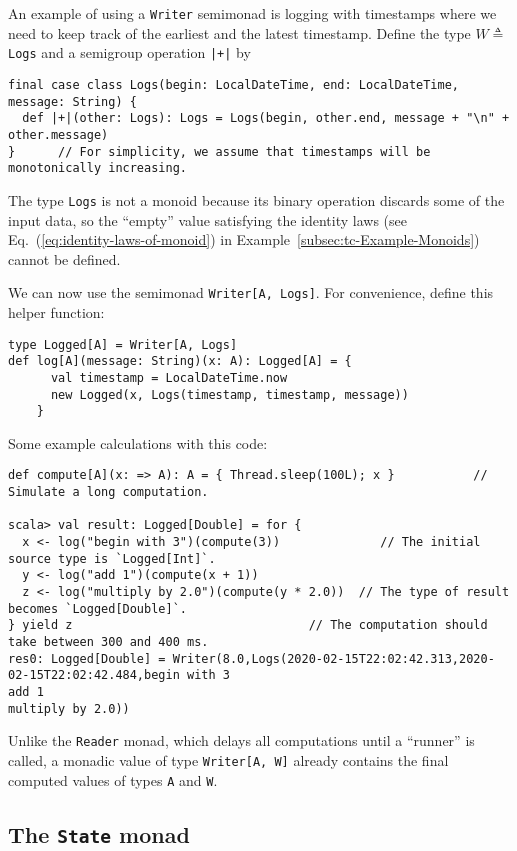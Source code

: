 An example of using a \lstinline!Writer! semimonad
is logging with timestamps where we need to keep track of the earliest
and the latest timestamp. Define the type $W\triangleq$\lstinline!Logs!
and a semigroup operation \lstinline!|+|! by
\begin{lstlisting}
final case class Logs(begin: LocalDateTime, end: LocalDateTime, message: String) {
  def |+|(other: Logs): Logs = Logs(begin, other.end, message + "\n" + other.message)
}      // For simplicity, we assume that timestamps will be monotonically increasing.
\end{lstlisting}
The type \lstinline!Logs! is not a monoid because its binary operation
discards some of the input data, so the \textsf{``}empty\textsf{''} value satisfying
the identity laws (see Eq.~(\ref{eq:identity-laws-of-monoid}) in
Example~\ref{subsec:tc-Example-Monoids}) cannot be defined.

We can now use the semimonad \lstinline!Writer[A, Logs]!. For convenience,
define this helper function:
\begin{lstlisting}
type Logged[A] = Writer[A, Logs]
def log[A](message: String)(x: A): Logged[A] = {
      val timestamp = LocalDateTime.now
      new Logged(x, Logs(timestamp, timestamp, message))
    }
\end{lstlisting}
Some example calculations with this code:
\begin{lstlisting}
def compute[A](x: => A): A = { Thread.sleep(100L); x }           // Simulate a long computation.

scala> val result: Logged[Double] = for {
  x <- log("begin with 3")(compute(3))              // The initial source type is `Logged[Int]`.
  y <- log("add 1")(compute(x + 1))
  z <- log("multiply by 2.0")(compute(y * 2.0))  // The type of result becomes `Logged[Double]`.
} yield z                                 // The computation should take between 300 and 400 ms.
res0: Logged[Double] = Writer(8.0,Logs(2020-02-15T22:02:42.313,2020-02-15T22:02:42.484,begin with 3
add 1
multiply by 2.0))
\end{lstlisting}

Unlike the \lstinline!Reader! monad, which delays all computations
until a \textsf{``}runner\textsf{''} is called, a monadic value of type \lstinline!Writer[A, W]!
already contains the final computed values of types \lstinline!A!
and \lstinline!W!.

\subsection{The \texttt{State} monad}

